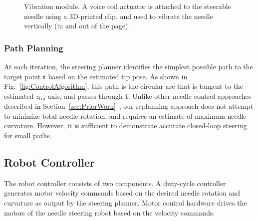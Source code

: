 \begin{figure}[!t]
\caption{Vibration module. A voice coil actuator is attached to the steerable needle using a 3D-printed clip, and used to vibrate the needle vertically (in and out of the page).}
\label{fig:Vibrator}
\end{figure}

\subsubsection{Path Planning}
At each iteration, the steering planner identifies the simplest possible path to the target point $\bm{t}$ based on the estimated tip pose. As shown in Fig.~\ref{fig:ControlAlgorithm}, this path is the circular arc that is tangent to the estimated $z_{\text{tip}}$-axis, and passes through $\bm{t}$.   Unlike other needle control approaches described in Section~\ref{sec:PriorWork}~\cite{Abayazid2014,Rucker2013}, our replanning approach does not attempt to minimize total needle rotation, and requires an estimate of maximum needle curvature. However, it is sufficient to demonstrate accurate closed-loop steering for small paths. 

\subsection{Robot Controller} 
The robot controller consists of two components. A duty-cycle controller generates motor velocity commands based on the desired needle rotation and curvature as output by the steering planner. Motor control hardware drives the motors of the needle steering robot based on the velocity commands.

